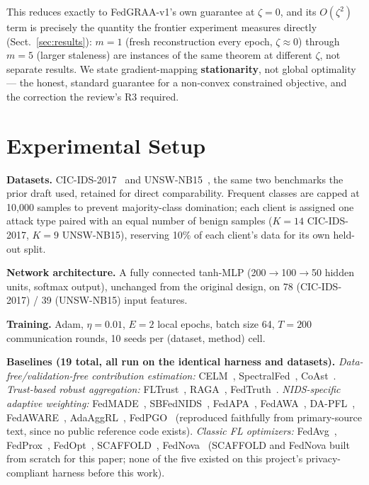 \documentclass{llncs}
\begin{document}
This reduces exactly to FedGRAA-v1's own guarantee at $\zeta=0$, and its $O(\zeta^2)$ term is precisely the quantity the frontier experiment measures directly (Sect.~\ref{sec:results}): $m=1$ (fresh reconstruction every epoch, $\zeta\approx0$) through $m=5$ (larger staleness) are instances of the same theorem at different $\zeta$, not separate results. We state gradient-mapping \textbf{stationarity}, not global optimality --- the honest, standard guarantee for a non-convex constrained objective, and the correction the review's R3 required.

\section{Experimental Setup}

\textbf{Datasets.} CIC-IDS-2017~\cite{CICIDS2017} and UNSW-NB15~\cite{UNSWNB15}, the same two benchmarks the prior draft used, retained for direct comparability. Frequent classes are capped at 10{,}000 samples to prevent majority-class domination; each client is assigned one attack type paired with an equal number of benign samples ($K=14$ CIC-IDS-2017, $K=9$ UNSW-NB15), reserving 10\% of each client's data for its own held-out split.

\textbf{Network architecture.} A fully connected tanh-MLP (200$\to$100$\to$50 hidden units, softmax output), unchanged from the original design, on 78 (CIC-IDS-2017) / 39 (UNSW-NB15) input features.

\textbf{Training.} Adam, $\eta=0.01$, $E=2$ local epochs, batch size 64, $T=200$ communication rounds, 10 seeds per (dataset, method) cell.

\textbf{Baselines (19 total, all run on the identical harness and datasets).} \emph{Data-free/validation-free contribution estimation:} CELM~\cite{CELM}, SpectralFed~\cite{SpectralFed}, CoAst~\cite{CoAst}. \emph{Trust-based robust aggregation:} FLTrust~\cite{FLTrust}, RAGA~\cite{RAGA}, FedTruth~\cite{FedTruth}. \emph{NIDS-specific adaptive weighting:} FedMADE~\cite{FedMADE}, SBFedNIDS~\cite{SBFedNIDS}, FedAPA~\cite{FedAPA}, FedAWA~\cite{FedAWA}, DA-PFL~\cite{DAPFL}, FedAWARE~\cite{FedAWARE}, AdaAggRL~\cite{AdaAggRL}, FedPGO~\cite{FedPGO} (reproduced faithfully from primary-source text, since no public reference code exists). \emph{Classic FL optimizers:} FedAvg~\cite{FedAvg}, FedProx~\cite{FedProx}, FedOpt~\cite{FedOpt}, SCAFFOLD~\cite{SCAFFOLD}, FedNova~\cite{FedNova} (SCAFFOLD and FedNova built from scratch for this paper; none of the five existed on this project's privacy-compliant harness before this work).
\end{document}
